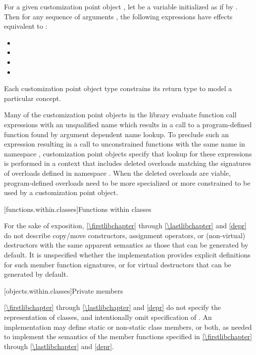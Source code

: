 \pnum
For a given customization point object ,
let  be a variable initialized as if by .
Then for any sequence of arguments ,
the following expressions have effects equivalent to :
\begin{itemize}
\item {}
\item {}
\item {}
\item {}
\end{itemize}

\pnum
Each customization point object type constrains its return type to model a
particular concept.

\pnum
\begin{note}
Many of the customization point objects in the library evaluate function call
expressions with an unqualified name which results in a call to a
program-defined function found by argument dependent name
lookup. To preclude such an expression resulting in a
call to unconstrained functions with the same name in namespace ,
customization point objects specify that lookup for these expressions is
performed in a context that includes deleted overloads matching the signatures
of overloads defined in namespace . When the deleted overloads are
viable, program-defined overloads need to be more specialized
or more constrained to be used by a customization point
object.
\end{note}

[functions.within.classes]{Functions within classes}

\pnum
For the sake of exposition, \ref{\firstlibchapter} through \ref{\lastlibchapter}
and \ref{depr} do not describe copy/move constructors, assignment
operators, or (non-virtual) destructors with the same apparent
semantics as those that can be generated
by default.
%
%
%
It is unspecified whether
the implementation provides explicit definitions for such member function
signatures, or for virtual destructors that can be generated by default.

[objects.within.classes]{Private members}

\pnum
\ref{\firstlibchapter} through \ref{\lastlibchapter} and
\ref{depr} do not specify the representation of classes, and intentionally
omit specification of . An implementation may
define static or non-static class members, or both, as needed to implement the
semantics of the member functions specified in \ref{\firstlibchapter}
through \ref{\lastlibchapter} and \ref{depr}.

